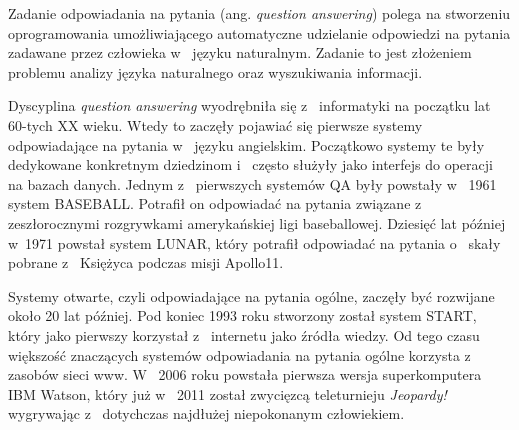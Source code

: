Zadanie odpowiadania na pytania (ang. \emph{question answering}) polega na stworzeniu oprogramowania umożliwiającego automatyczne udzielanie odpowiedzi na pytania zadawane przez człowieka w~ języku naturalnym. Zadanie to jest złożeniem problemu analizy języka naturalnego oraz wyszukiwania informacji.

Dyscyplina \emph{question answering} wyodrębniła się z~ informatyki na początku lat 60-tych XX wieku. Wtedy to zaczęły pojawiać się pierwsze systemy odpowiadające na pytania w~ języku angielskim. Początkowo systemy te były dedykowane konkretnym dziedzinom i~ często służyły jako interfejs do operacji na bazach danych. Jednym z~ pierwszych systemów QA były powstały  w~ 1961 system BASEBALL. Potrafił on odpowiadać na pytania związane z~ zeszłorocznymi rozgrywkami amerykańskiej ligi baseballowej. Dziesięć lat później w~1971 powstał system LUNAR, który potrafił odpowiadać na pytania o~ skały pobrane z~ Księżyca podczas misji Apollo11. 

Systemy otwarte, czyli odpowiadające na pytania ogólne, zaczęły być rozwijane około 20 lat później. Pod koniec 1993 roku stworzony został system START, który jako pierwszy korzystał z~ internetu jako źródła wiedzy. Od tego czasu większość znaczących systemów odpowiadania na pytania ogólne korzysta z~ zasobów sieci www. W~ 2006 roku powstała pierwsza wersja superkomputera IBM Watson, który już  w~ 2011 został zwycięzcą teleturnieju \emph{Jeopardy!} wygrywając z~ dotychczas najdłużej niepokonanym człowiekiem.



